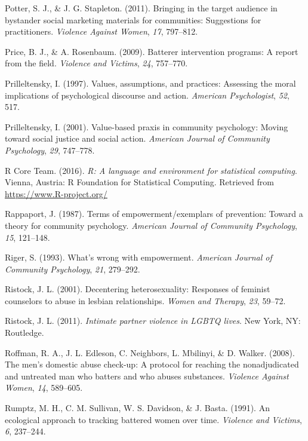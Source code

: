 \documentclass[11pt,]{tufte-book}
\begin{document}
\hypertarget{ref-potter2011bringing}{}
Potter, S. J., \& J. G. Stapleton. (2011). Bringing in the target
audience in bystander social marketing materials for communities:
Suggestions for practitioners. \emph{Violence Against Women}, \emph{17},
797--812.

\hypertarget{ref-price2009batterer}{}
Price, B. J., \& A. Rosenbaum. (2009). Batterer intervention programs: A
report from the field. \emph{Violence and Victims}, \emph{24}, 757--770.

\hypertarget{ref-prilleltensky1997values}{}
Prilleltensky, I. (1997). Values, assumptions, and practices: Assessing
the moral implications of psychological discourse and action.
\emph{American Psychologist}, \emph{52}, 517.

\hypertarget{ref-prilleltensky2001value-based}{}
Prilleltensky, I. (2001). Value-based praxis in community psychology:
Moving toward social justice and social action. \emph{American Journal
of Community Psychology}, \emph{29}, 747--778.

\hypertarget{ref-R-base}{}
R Core Team. (2016). \emph{R: A language and environment for statistical
computing}. Vienna, Austria: R Foundation for Statistical Computing.
Retrieved from \url{https://www.R-project.org/}

\hypertarget{ref-rappaport1987terms}{}
Rappaport, J. (1987). Terms of empowerment/exemplars of prevention:
Toward a theory for community psychology. \emph{American Journal of
Community Psychology}, \emph{15}, 121--148.

\hypertarget{ref-riger1993what}{}
Riger, S. (1993). What's wrong with empowerment. \emph{American Journal
of Community Psychology}, \emph{21}, 279--292.

\hypertarget{ref-ristock2001decentering}{}
Ristock, J. L. (2001). Decentering heterosexuality: Responses of
feminist counselors to abuse in lesbian relationships. \emph{Women and
Therapy}, \emph{23}, 59--72.

\hypertarget{ref-ristock2011intimate}{}
Ristock, J. L. (2011). \emph{Intimate partner violence in LGBTQ lives}.
New York, NY: Routledge.

\hypertarget{ref-roffman2008mens}{}
Roffman, R. A., J. L. Edleson, C. Neighbors, L. Mbilinyi, \& D. Walker.
(2008). The men's domestic abuse check-up: A protocol for reaching the
nonadjudicated and untreated man who batters and who abuses substances.
\emph{Violence Against Women}, \emph{14}, 589--605.

\hypertarget{ref-rumptz1991ecological}{}
Rumptz, M. H., C. M. Sullivan, W. S. Davidson, \& J. Basta. (1991). An
ecological approach to tracking battered women over time. \emph{Violence
and Victims}, \emph{6}, 237--244.
\end{document}
